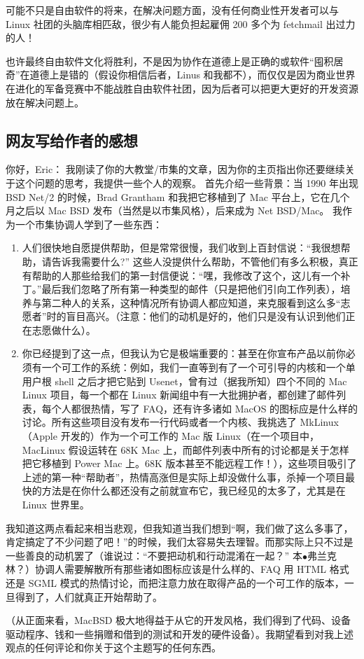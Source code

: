 可能不只是自由软件的将来，在解决问题方面，没有任何商业性开发者可以与 Linux 社团的头脑库相匹敌，很少有人能负担起雇佣 200 多个为 fetchmail 出过力的人！


也许最终自由软件文化将胜利，不是因为协作在道德上是正确的或软件“囤积居奇”在道德上是错的（假设你相信后者，Linus 和我都不），而仅仅是因为商业世界在进化的军备竞赛中不能战胜自由软件社团，因为后者可以把更大更好的开发资源放在解决问题上。

\subsection{网友写给作者的感想}

你好，Eric：
我刚读了你的大教堂/市集的文章，因为你的主页指出你还要继续关于这个问题的思考，我提供一些个人的观察。 首先介绍一些背景：当 1990 年出现 BSD Net/2 的时候，Brad Grantham 和我把它移植到了 Mac 平台上，它在几个月之后以 Mac BSD 发布（当然是以市集风格），后来成为 Net BSD/Mac。 我作为一个市集协调人学到了一些东西：

\begin{enumerate}
\item 人们很快地自愿提供帮助，但是常常很慢，我们收到上百封信说：“我很想帮助，请告诉我需要什么?” 这些人没提供什么帮助，不管他们有多么积极，真正有帮助的人那些给我们的第一封信便说：“嘿，我修改了这个，这儿有一个补丁。”最后我们忽略了所有第一种类型的邮件（只是把他们引向工作列表），培养与第二种人的关系，这种情况所有协调人都应知道，来克服看到这么多“志愿者”时的盲目高兴。（注意：他们的动机是好的，他们只是没有认识到他们正在志愿做什么）。

\item 你已经提到了这一点，但我认为它是极端重要的：甚至在你宣布产品以前你必须有一个可工作的系统：例如，我们一直等到有了一个可引导的内核和一个单用户根 shell 之后才把它贴到 Usenet，曾有过（据我所知）四个不同的 Mac Linux 项目，每一个都在 Linux 新闻组中有一大批拥护者，都创建了邮件列表，每个人都很热情，写了 FAQ，还有许多诸如 MacOS 的图标应是什么样的讨论。所有这些项目没有发布一行代码或者一个内核、我挑选了 MkLinux（Apple 开发的）作为一个可工作的 Mac 版 Linux（在一个项目中，MacLinux 假设运转在 68K Mac 上，而邮件列表中所有的讨论都是关于怎样把它移植到 Power Mac 上。68K 版本甚至不能远程工作！），这些项目吸引了上述的第一种“帮助者”，热情高涨但是实际上却没做什么事，杀掉一个项目最快的方法是在你什么都还没有之前就宣布它，我已经见的太多了，尤其是在 Linux 世界里。
\end{enumerate}

我知道这两点看起来相当悲观，但我知道当我们想到“啊，我们做了这么多事了，肯定搞定了不少问题了吧！”的时候，我们太容易失去理智。而那实际上只不过是一些善良的动机罢了（谁说过：“不要把动机和行动混淆在一起？” 本$\bullet$弗兰克林？）协调人需要解散所有那些诸如图标应该是什么样的、FAQ 用 HTML 格式还是 SGML 模式的热情讨论，而把注意力放在取得产品的一个可工作的版本，一旦得到了，人们就真正开始帮助了。

（从正面来看，MacBSD 极大地得益于从它的开发风格，我们得到了代码、设备驱动程序、钱和一些捐赠和借到的测试和开发的硬件设备）。我期望看到对我上述观点的任何评论和你关于这个主题写的任何东西。

